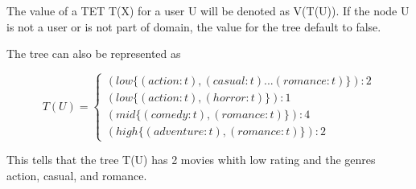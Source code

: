 The value of a TET T(X) for a user U will be denoted as V(T(U)). If the node U is not a user or is not part of domain, the value for the tree default to false.

The tree can also be represented as 

\begin{equation}
    T(U)=
    \begin{cases}
      (low \{(action:t),(casual:t)... (romance:t)\}):2 \\
      (low \{(action:t),(horror:t)\}):1 \\
      (mid \{(comedy:t),(romance:t)\}):4 \\
      (high\{(adventure:t),(romance:t)\}):2
    \end{cases}
\end{equation}

This tells that the tree T(U) has 2 movies whith low rating and the genres action, casual, and romance.